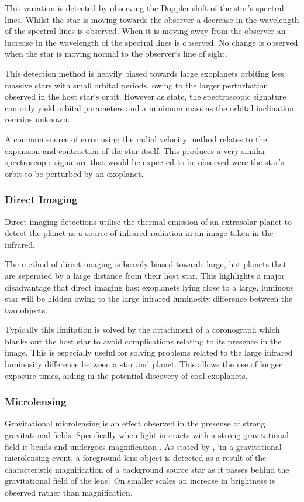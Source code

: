 \documentclass{report}
\begin{document}
This variation is detected by observing the Doppler shift of the star’s spectral lines. Whilst the star is moving towards the observer a decrease in the wavelength of the spectral lines is observed. When it is moving away from the observer an increase in the wavelength of the spectral lines is observed. No change is observed when the star is moving normal to the observer`s line of sight. 

This detection method is heavily biased towards large exoplanets orbiting less massive stars with small orbital periods, owing to the larger perturbation observed in the host star’s orbit. However as \textcite{stats} state, the spectroscopic signature can only yield orbital parameters and a minimum mass as the orbital inclination remains unknown. 

A common source of error using the radial velocity method relates to the expansion and contraction of the star itself. This produces a very similar spectroscopic signature that would be expected to be observed were the star's orbit to be perturbed by an exoplanet.

\subsubsection{Direct Imaging }
Direct imaging detections utilise the thermal emission of an extrasolar planet to detect the planet as a source of infrared radiation in an image taken in the infrared. 

The method of direct imaging is heavily biased towards large, hot planets that are seperated by a large distance from their host star. This highlights a major disadvantage that direct imaging has: exoplanets lying close to a large, luminous star will be hidden owing to the large infrared luminosity difference between the two objects.   

Typically this limitation is solved by the attachment of a coronograph which blanks out the host star to avoid complications relating to its presence in the image. This is especially useful for solving problems related to the large infrared luminosity difference between a star and planet. This allows the use of longer exposure times, aiding in the potential discovery of cool exoplanets. 

\subsubsection{Microlensing }
Gravitational microlensing is an effect observed in the presense of strong gravitational fields. Specifically when light interacts with a strong gravitational field it bends and undergoes magnification \parencite{einstein}. As stated by \textcite{micro}, `in a gravitational microlensing event, a foreground lens object is detected as a result of the characteristic magnification of a background source star as it passes behind the gravitational field of the lens'. On smaller scales an increase in brightness is observed rather than magnification.
\end{document}
